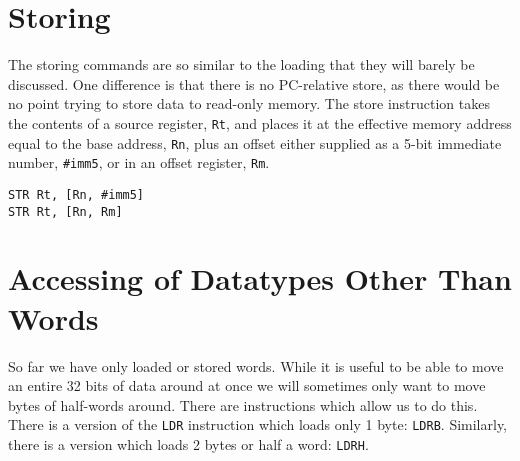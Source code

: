 \section{Storing}
The storing commands are so similar to the loading that they will barely be discussed. One difference is that there is no PC-relative store, as there would be no point trying to store data to read-only memory. The store instruction takes the contents of a source register, \texttt{Rt}, and places it at the effective memory address equal to the base address, \texttt{Rn}, plus an offset either supplied as a 5-bit immediate number, \texttt{\#imm5}, or in an offset register, \texttt{Rm}.

\begin{lstlisting}[fontadjust=true,frame=trBL]
STR Rt, [Rn, #imm5]
STR Rt, [Rn, Rm]
\end{lstlisting}

\section{Accessing of Datatypes Other Than Words}
So far we have only loaded or stored words. While it is useful to be able to move an entire 32 bits of data around at once we will sometimes only want to move bytes of half-words around. There are instructions which allow us to do this. There is a version of the \texttt{LDR} instruction which loads only 1 byte: \texttt{LDRB}. Similarly, there is a version which loads 2 bytes or half a word: \texttt{LDRH}. 

